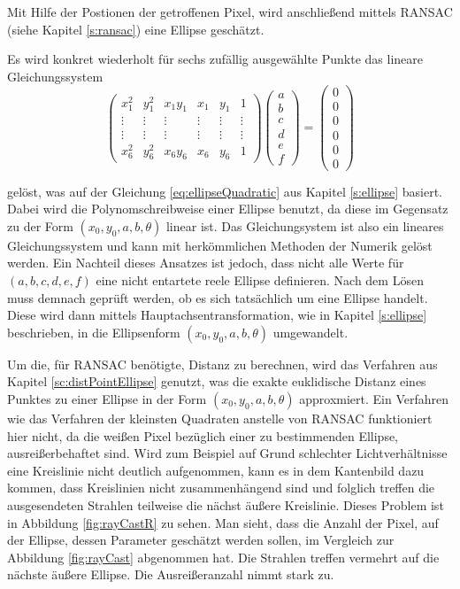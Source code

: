 Mit Hilfe der Postionen der getroffenen Pixel, wird anschließend mittels RANSAC (siehe Kapitel \ref{s:ransac}) eine Ellipse geschätzt.

Es wird konkret wiederholt für sechs zufällig ausgewählte Punkte das lineare Gleichungssystem
\[
\begin{pmatrix}
x_1^2 & y_1^2 & x_1y_1 & x_1 & y_1 & 1\\
\vdots &\vdots & \vdots & \vdots &\vdots & \vdots\\
\vdots &\vdots & \vdots & \vdots &\vdots & \vdots\\
x_6^2 & y_6^2 & x_6y_6 & x_6 & y_6 & 1
\end{pmatrix} \begin{pmatrix}
a \\ b \\ c \\ d \\ e \\ f
\end{pmatrix} = \begin{pmatrix}
0 \\ 0 \\ 0 \\ 0 \\ 0 \\ 0
\end{pmatrix}
\]

gelöst, was auf der Gleichung \ref{eq:ellipseQuadratic} aus Kapitel \ref{s:ellipse} basiert. Dabei wird die Polynomschreibweise einer Ellipse benutzt, da diese im Gegensatz zu der Form $(x_0,y_0,a,b,\theta)$ linear ist. Das Gleichungsystem ist also ein lineares Gleichungssystem und kann mit herkömmlichen Methoden der Numerik gelöst werden. Ein Nachteil dieses Ansatzes ist jedoch, dass nicht alle Werte für $(a,b,c,d,e,f)$ eine nicht entartete reele Ellipse definieren. Nach dem Lösen muss demnach geprüft werden, ob es sich tatsächlich um eine Ellipse handelt.
Diese wird dann mittels Hauptachsentransformation, wie in Kapitel \ref{s:ellipse} beschrieben, in die Ellipsenform $(x_0,y_0,a,b,\theta)$ umgewandelt.

Um die, für RANSAC benötigte, Distanz zu berechnen, wird das Verfahren aus Kapitel \ref{sc:distPointEllipse} genutzt, was die exakte euklidische Distanz eines Punktes zu einer Ellipse in der Form $(x_0,y_0,a,b,\theta)$ approxmiert.
Ein Verfahren wie das Verfahren der kleinsten Quadraten anstelle von RANSAC funktioniert hier nicht, da die weißen Pixel bezüglich einer zu bestimmenden Ellipse, ausreißerbehaftet sind. Wird zum Beispiel auf Grund schlechter Lichtverhältnisse eine Kreislinie nicht deutlich aufgenommen, kann es in dem Kantenbild dazu kommen, dass Kreislinien nicht zusammenhängend sind und folglich treffen die ausgesendeten Strahlen teilweise die nächst äußere Kreislinie. Dieses Problem ist in Abbildung \ref{fig:rayCastR} zu sehen. Man sieht, dass die Anzahl der Pixel, auf der Ellipse, dessen Parameter geschätzt werden sollen, im Vergleich zur Abbildung \ref{fig:rayCast} abgenommen hat. Die Strahlen treffen vermehrt auf die nächste äußere Ellipse. Die Ausreißeranzahl nimmt stark zu.

